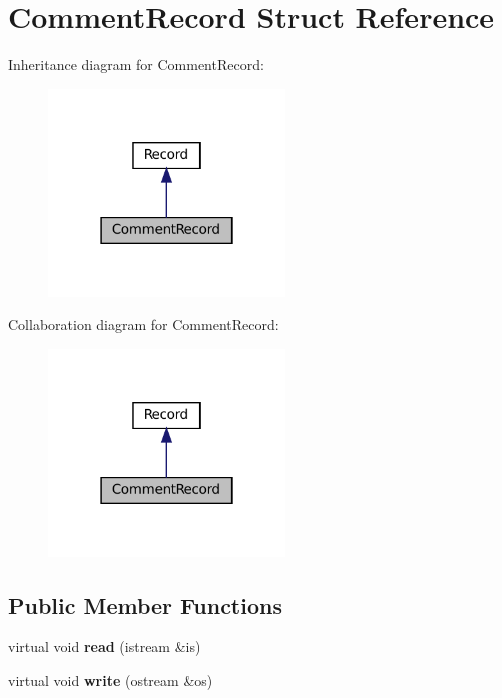 \hypertarget{structCommentRecord}{}\section{Comment\+Record Struct Reference}
\label{structCommentRecord}


Inheritance diagram for Comment\+Record\+:
\nopagebreak
\begin{figure}[H]
\begin{center}
\leavevmode
\includegraphics[width=178pt]{structCommentRecord__inherit__graph}
\end{center}
\end{figure}


Collaboration diagram for Comment\+Record\+:
\nopagebreak
\begin{figure}[H]
\begin{center}
\leavevmode
\includegraphics[width=178pt]{structCommentRecord__coll__graph}
\end{center}
\end{figure}
\subsection*{Public Member Functions}
\begin{DoxyCompactItemize}
\item 
\mbox{\label{structCommentRecord_a1c329da7104b5df5dfb1299a51da1753}} 
virtual void {\bfseries read} (istream \&is)
\item 
\mbox{\label{structCommentRecord_acfd4ebd198b1765756916233b792c5e3}} 
virtual void {\bfseries write} (ostream \&os)
\end{DoxyCompactItemize}
